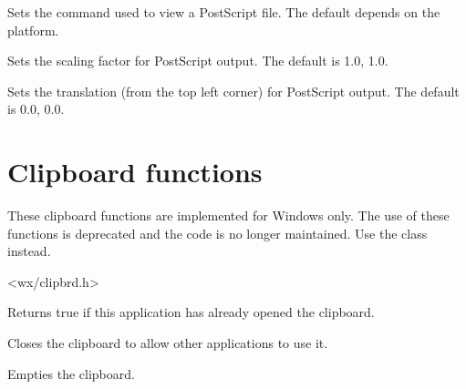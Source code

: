 \label{wxsetprinterpreviewcommand}


Sets the command used to view a PostScript file. The default depends on the platform.


\label{wxsetprinterscaling}


Sets the scaling factor for PostScript output. The default is 1.0, 1.0.


\label{wxsetprintertranslation}


Sets the translation (from the top left corner) for PostScript output. The default is 0.0, 0.0.



\section{Clipboard functions}\label{clipsboard}

These clipboard functions are implemented for Windows only. The use of these functions
is deprecated and the code is no longer maintained. Use the 
class instead.


<wx/clipbrd.h>


\label{functionwxclipboardopen}


Returns true if this application has already opened the clipboard.


\label{wxcloseclipboard}


Closes the clipboard to allow other applications to use it.


\label{wxemptyclipboard}


Empties the clipboard.


\label{wxenumclipboardformats}


